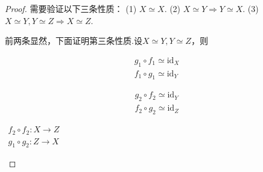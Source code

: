 \begin{proof}
    需要验证以下三条性质：
    (1) $X \simeq X$.
    (2) $X \simeq Y \Rightarrow Y \simeq X$.
    (3) $X \simeq Y, Y \simeq Z \Rightarrow X \simeq Z$.\par
    前两条显然，下面证明第三条性质.设$X\simeq Y,Y\simeq Z$，则 \par
    \hspace{-2em}
    \begin{minipage}[t]{0.49\textwidth}
        \begin{center}
        \end{center}
        \vspace{-1 em}
        \begin{gather*}
            g_1 \circ f_1 \simeq \mathrm{id}_X \\[-5pt]
            f_1 \circ g_1 \simeq \mathrm{id}_Y
        \end{gather*}
    \end{minipage}
    \vspace{-1 em}
    \begin{minipage}[t]{0.49\textwidth}
        \begin{center}
        \end{center}
        \vspace{-1 em}
        \begin{gather*}
            g_2\circ f_2 \simeq \mathrm{id}_Y \\[-5pt]
            f_2 \circ g_2 \simeq \mathrm{id}_Z
        \end{gather*}
    \end{minipage}\par
    \begin{center}
        $\begin{aligned}
        f_2 \circ f_2:X\to Z\\[-5pt]
        g_1 \circ g_2:Z\to X 
    \end{aligned}$
    \hspace{10em}
    \begin{tikzcd}[labels={font=\normalsize}]

\end{tikzcd}
\end{center}
\end{proof}
